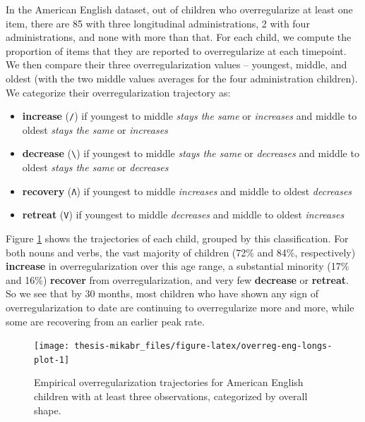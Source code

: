 \documentclass[
   11pt,
       ]{book}
\providecommand{\tightlist}{%
    \setlength{\itemsep}{0pt}\setlength{\parskip}{0pt}}
\begin{document}
In the American English dataset, out of children who overregularize at least one item, there are 85 with three longitudinal administrations, 2 with four administrations, and none with more than that. For each child, we compute the proportion of items that they are reported to overregularize at each timepoint. We then compare their three overregularization values -- youngest, middle, and oldest (with the two middle values averages for the four administration children). We categorize their overregularization trajectory as:

\begin{itemize}
\tightlist
\item
  \textbf{increase} (\texttt{/}) if youngest to middle \emph{stays the same} or \emph{increases} and middle to oldest \emph{stays the same} or \emph{increases}
\item
  \textbf{decrease} (\texttt{\textbackslash{}}) if youngest to middle \emph{stays the same} or \emph{decreases} and middle to oldest \emph{stays the same} or \emph{decreases}
\item
  \textbf{recovery} (\texttt{Λ}) if youngest to middle \emph{increases} and middle to oldest \emph{decreases}
\item
  \textbf{retreat} (\texttt{V}) if youngest to middle \emph{decreases} and middle to oldest \emph{increases}
\end{itemize}

Figure \ref{fig:overreg-eng-longs-plot} shows the trajectories of each child, grouped by this classification. For both nouns and verbs, the vast majority of children (72\% and 84\%, respectively) \textbf{increase} in overregularization over this age range, a substantial minority (17\% and 16\%) \textbf{recover} from overregularization, and very few \textbf{decrease} or \textbf{retreat}. So we see that by 30 months, most children who have shown any sign of overregularization to date are continuing to overregularize more and more, while some are recovering from an earlier peak rate.

\begin{figure}

{\centering \texttt{[image: thesis-mikabr\_files/figure-latex/overreg-eng-longs-plot-1]} 

}

\caption{Empirical overregularization trajectories for American English children with at least three observations, categorized by overall shape.}\label{fig:overreg-eng-longs-plot}
\end{figure}
\end{document}

